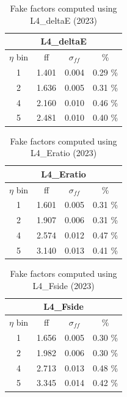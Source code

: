 \begin{minipage}[t]{\textwidth}

  \begin{minipage}[t]{0.32\textwidth}
    \begin{table}[H]
      \centering
      \begin{tabular}{|c|c|c|c|}
        \hline
        \multicolumn{4}{|c|}{\textbf{L4\_deltaE}} \\
        \hline
        $\eta$ bin & ff & $\sigma_{ff}$ & \% \\
        \hline
        1 & 1.401 & 0.004 & 0.29 \% \\
        \hline
        2 & 1.636 & 0.005 & 0.31 \% \\
        \hline
        4 & 2.160 & 0.010 & 0.46 \% \\
        \hline
        5 & 2.481 & 0.010 & 0.40 \% \\
        \hline
      \end{tabular}
      \caption{Fake factors computed using L4\_deltaE (2023)}
    \end{table}
  \end{minipage}
  \begin{minipage}[t]{0.32\textwidth}
    \begin{table}[H]
      \centering
      \begin{tabular}{|c|c|c|c|}
        \hline
        \multicolumn{4}{|c|}{\textbf{L4\_Eratio}} \\
        \hline
        $\eta$ bin & ff & $\sigma_{ff}$ & \% \\
        \hline
        1 & 1.601 & 0.005 & 0.31 \% \\
        \hline
        2 & 1.907 & 0.006 & 0.31 \% \\
        \hline
        4 & 2.574 & 0.012 & 0.47 \% \\
        \hline
        5 & 3.140 & 0.013 & 0.41 \% \\
        \hline
      \end{tabular}
      \caption{Fake factors computed using L4\_Eratio (2023)}
    \end{table}
  \end{minipage}
  \begin{minipage}[t]{0.32\textwidth}
    \begin{table}[H]
      \centering
      \begin{tabular}{|c|c|c|c|}
        \hline
        \multicolumn{4}{|c|}{\textbf{L4\_Fside}} \\
        \hline
        $\eta$ bin & ff & $\sigma_{ff}$ & \% \\
        \hline
        1 & 1.656 & 0.005 & 0.30 \% \\
        \hline
        2 & 1.982 & 0.006 & 0.30 \% \\
        \hline
        4 & 2.713 & 0.013 & 0.48 \% \\
        \hline
        5 & 3.345 & 0.014 & 0.42 \% \\
        \hline
      \end{tabular}
      \caption{Fake factors computed using L4\_Fside (2023)}
    \end{table}
  \end{minipage}
  

\end{minipage}
